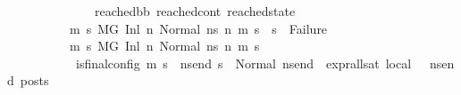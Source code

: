 \begin{isabellebody}
\ \ \ \ \ \ \ \ \ \ \ \ \ \ {\isacharparenleft}{\kern0pt}reached{\isacharunderscore}{\kern0pt}bb{\isacharcomma}{\kern0pt}\ reached{\isacharunderscore}{\kern0pt}cont{\isacharcomma}{\kern0pt}\ reached{\isacharunderscore}{\kern0pt}state{\isacharparenright}{\kern0pt}\ {\isasymLongrightarrow}\isanewline
\ \ \ \ \ \ \ \ \ \ {\isacharparenleft}{\kern0pt}{\isasymAnd}m{\isacharprime}{\kern0pt}\ s{\isacharprime}{\kern0pt}{\isachardot}{\kern0pt}\ M{\isacharcomma}{\kern0pt}{\isasymLambda}{\isacharcomma}{\kern0pt}{\isasymGamma}{\isacharcomma}{\kern0pt}{\isasymOmega}{\isacharcomma}{\kern0pt}G\ {\isasymturnstile}{\isacharparenleft}{\kern0pt}Inl\ n{\isacharcomma}{\kern0pt}\ Normal\ ns{}{\isacharprime}{\kern0pt}{\isacharprime}{\kern0pt}{\isacharparenright}{\kern0pt}\ {\isacharminus}{\kern0pt}n{\isasymrightarrow}{\isacharasterisk}{\kern0pt}\ {\isacharparenleft}{\kern0pt}m{\isacharprime}{\kern0pt}{\isacharcomma}{\kern0pt}\ s{\isacharprime}{\kern0pt}{\isacharparenright}{\kern0pt}\ {\isasymLongrightarrow}\ s{\isacharprime}{\kern0pt}\ {\isasymnoteq}\ Failure{\isacharparenright}{\kern0pt}\ {\isasymLongrightarrow}\isanewline
\ \ \ \ \ \ \ \ \ \ {\isacharparenleft}{\kern0pt}{\isasymAnd}m{\isacharprime}{\kern0pt}\ s{\isacharprime}{\kern0pt}{\isachardot}{\kern0pt}\ {\isacharparenleft}{\kern0pt}M{\isacharcomma}{\kern0pt}{\isasymLambda}{\isacharcomma}{\kern0pt}{\isasymGamma}{\isacharcomma}{\kern0pt}{\isasymOmega}{\isacharcomma}{\kern0pt}G\ {\isasymturnstile}{\isacharparenleft}{\kern0pt}Inl\ n{\isacharcomma}{\kern0pt}\ Normal\ ns{}{\isacharprime}{\kern0pt}{\isacharprime}{\kern0pt}{\isacharparenright}{\kern0pt}\ {\isacharminus}{\kern0pt}n{\isasymrightarrow}{\isacharasterisk}{\kern0pt}\ {\isacharparenleft}{\kern0pt}m{\isacharprime}{\kern0pt}{\isacharcomma}{\kern0pt}\ s{\isacharprime}{\kern0pt}{\isacharparenright}{\kern0pt}{\isacharparenright}{\kern0pt}\ {\isasymLongrightarrow}\isanewline
\ \ \ \ \ \ \ \ \ \ \ is{\isacharunderscore}{\kern0pt}final{\isacharunderscore}{\kern0pt}config\ {\isacharparenleft}{\kern0pt}m{\isacharprime}{\kern0pt}{\isacharcomma}{\kern0pt}\ s{\isacharprime}{\kern0pt}{\isacharparenright}{\kern0pt}\ {\isasymLongrightarrow}\ {\isasymforall}ns{\isacharunderscore}{\kern0pt}end{\isachardot}{\kern0pt}\ s{\isacharprime}{\kern0pt}\ {\isacharequal}{\kern0pt}\ Normal\ ns{\isacharunderscore}{\kern0pt}end\ {\isasymlongrightarrow}\ {\isacharparenleft}{\kern0pt}expr{\isacharunderscore}{\kern0pt}all{\isacharunderscore}{\kern0pt}sat\ {\isasymLambda}{}{\isacharunderscore}{\kern0pt}local\ {\isasymGamma}\ {\isasymOmega}\ ns{\isacharunderscore}{\kern0pt}end{\isacharparenright}{\kern0pt}\ posts{\isacharparenright}{\kern0pt}\ {\isasymLongrightarrow}\ \isanewline

\end{isabellebody}
